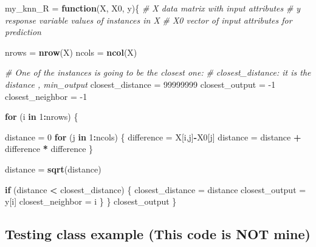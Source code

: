 \documentclass[]{article}
\newenvironment{Shaded}{\begin{snugshade}}{\end{snugshade}}
\newcommand{\CommentTok}[1]{\textcolor[rgb]{0.56,0.35,0.01}{\textit{#1}}}
\newcommand{\ControlFlowTok}[1]{\textcolor[rgb]{0.13,0.29,0.53}{\textbf{#1}}}
\newcommand{\DecValTok}[1]{\textcolor[rgb]{0.00,0.00,0.81}{#1}}
\newcommand{\KeywordTok}[1]{\textcolor[rgb]{0.13,0.29,0.53}{\textbf{#1}}}
\newcommand{\NormalTok}[1]{#1}
\newcommand{\OperatorTok}[1]{\textcolor[rgb]{0.81,0.36,0.00}{\textbf{#1}}}
\newcommand{\StringTok}[1]{\textcolor[rgb]{0.31,0.60,0.02}{#1}}
\begin{document}
\begin{Shaded}
\begin{Highlighting}[]
\NormalTok{my_knn_R =}\StringTok{ }\ControlFlowTok{function}\NormalTok{(X, X0, y)\{}
  \CommentTok{# X data matrix with input attributes}
  \CommentTok{# y response variable values of instances in X  }
  \CommentTok{# X0 vector of input attributes for prediction}
  
\NormalTok{  nrows =}\StringTok{ }\KeywordTok{nrow}\NormalTok{(X)}
\NormalTok{  ncols =}\StringTok{ }\KeywordTok{ncol}\NormalTok{(X)}
  
  \CommentTok{# One of the instances is going to be the closest one:}
  \CommentTok{# closest_distance: it is the distance , min_output}
\NormalTok{  closest_distance =}\StringTok{ }\DecValTok{99999999}
\NormalTok{  closest_output =}\StringTok{ }\DecValTok{-1}
\NormalTok{  closest_neighbor =}\StringTok{ }\DecValTok{-1}
  
  \ControlFlowTok{for}\NormalTok{ (i }\ControlFlowTok{in} \DecValTok{1}\OperatorTok{:}\NormalTok{nrows) \{}

\NormalTok{    distance =}\StringTok{ }\DecValTok{0}
    \ControlFlowTok{for}\NormalTok{ (j }\ControlFlowTok{in} \DecValTok{1}\OperatorTok{:}\NormalTok{ncols) \{}
\NormalTok{      difference =}\StringTok{ }\NormalTok{X[i,j]}\OperatorTok{-}\NormalTok{X0[j]}
\NormalTok{      distance =}\StringTok{ }\NormalTok{distance }\OperatorTok{+}\StringTok{ }\NormalTok{difference }\OperatorTok{*}\StringTok{ }\NormalTok{difference}
\NormalTok{    \}}
    
\NormalTok{    distance =}\StringTok{ }\KeywordTok{sqrt}\NormalTok{(distance)}
    
    \ControlFlowTok{if}\NormalTok{ (distance }\OperatorTok{<}\StringTok{ }\NormalTok{closest_distance) \{}
\NormalTok{      closest_distance =}\StringTok{ }\NormalTok{distance}
\NormalTok{      closest_output =}\StringTok{ }\NormalTok{y[i]}
\NormalTok{      closest_neighbor =}\StringTok{ }\NormalTok{i}
\NormalTok{    \}}
\NormalTok{  \}}
\NormalTok{  closest_output}
\NormalTok{\}  }
\end{Highlighting}
\end{Shaded}

\hypertarget{testing-class-example-this-code-is-not-mine}{%
\subsection{Testing class example (This code is NOT
mine)}\label{testing-class-example-this-code-is-not-mine}}
\end{document}
